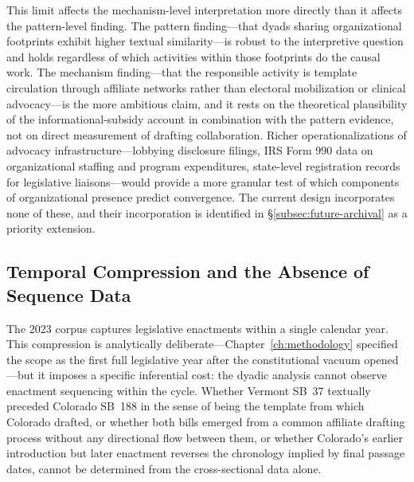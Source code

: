 This limit affects the mechanism-level interpretation more directly than it affects the pattern-level finding. The pattern finding---that dyads sharing organizational footprints exhibit higher textual similarity---is robust to the interpretive question and holds regardless of which activities within those footprints do the causal work. The mechanism finding---that the responsible activity is template circulation through affiliate networks rather than electoral mobilization or clinical advocacy---is the more ambitious claim, and it rests on the theoretical plausibility of the informational-subsidy account in combination with the pattern evidence, not on direct measurement of drafting collaboration. Richer operationalizations
 of advocacy infrastructure---lobbying disclosure filings, IRS Form 990 data on organizational staffing and program expenditures, state-level registration records for legislative liaisons---would provide a more granular test of which components of organizational presence predict convergence. The current design incorporates none of these, and their incorporation is identified in \S\ref{subsec:future-archival} as a priority extension.

 \subsection{Temporal Compression and the Absence of Sequence Data}
 \label{subsec:temporal-compression}
The 2023 corpus captures legislative enactments within a single calendar year. This compression is analytically deliberate---Chapter~\ref{ch:methodology} specified the scope as the first full legislative year after the constitutional vacuum opened---but it imposes a specific inferential cost: the dyadic analysis cannot observe enactment sequencing within the cycle. Whether Vermont SB~37 textually preceded Colorado SB~188 in the sense of being the template from which Colorado drafted, or whether both bills emerged from a common affiliate drafting process without any directional flow between them, or whether Colorado's earlier introduction but later enactment reverses the chronology implied by final passage dates, cannot be determined from
the cross-sectional data alone.


